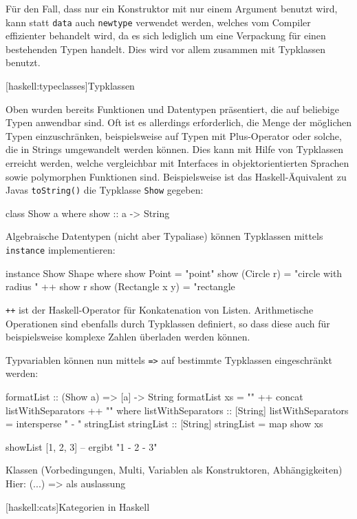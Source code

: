 \documentclass[11pt, a4paper, bibgerm]{scrbook}
\newcommand\icode[1]{\lstinline?#1?}
\newcommand\lsection{}
\begin{document}
Für den Fall, dass nur ein Konstruktor mit nur einem Argument benutzt
wird, kann statt \icode{data} auch \icode{newtype} verwendet
werden, welches vom Compiler effizienter behandelt wird, da es sich
lediglich um eine Verpackung für einen bestehenden Typen handelt. Dies
wird vor allem zusammen mit Typklassen benutzt.

\lsection[haskell:typeclasses]{Typklassen}

Oben wurden bereits Funktionen und Datentypen präsentiert, die auf
beliebige Typen anwendbar sind. Oft ist es allerdings erforderlich, die
Menge der möglichen Typen einzuschränken, beispielsweise auf Typen mit
Plus-Operator oder solche, die in Strings umgewandelt werden
können. Dies kann mit Hilfe von Typklassen erreicht werden, welche
vergleichbar mit Interfaces in objektorientierten Sprachen sowie
polymorphen Funktionen sind. Beispielsweise ist das Haskell-Äquivalent
zu Javas \icode{toString()} die Typklasse \icode{Show} gegeben:
\begin{code}
class Show a where
  show :: a -> String
\end{code}
Algebraische Datentypen (nicht aber Typaliase) können Typklassen mittels
\icode{instance} implementieren:
\begin{code}
instance Show Shape where
  show Point           = "point"
  show (Circle r)      = "circle with radius " ++ show r
  show (Rectangle x y) = "rectangle
\end{code}
\icode{++} ist der Haskell-Operator für Konkatenation von Listen.
Arithmetische Operationen sind ebenfalls durch Typklassen definiert, so
dass diese auch für beispielsweise komplexe Zahlen überladen werden
können.

Typvariablen können nun mittels \icode{=>} auf bestimmte Typklassen
eingeschränkt werden:
\begin{code}
formatList :: (Show a) => [a] -> String
formatList xs = "{" ++ concat listWithSeparators ++ "}"
  where listWithSeparators :: [String]
        listWithSeparators = intersperse " - " stringList
        stringList :: [String]
        stringList = map show xs

showList [1, 2, 3] -- ergibt "{1 - 2 - 3}"
\end{code}

 Klassen (Vorbedingungen, Multi, Variablen als Konstruktoren, Abhängigkeiten)
 Hier: (...) => als auslassung

\lsection[haskell:cats]{Kategorien in Haskell}
\end{document}

